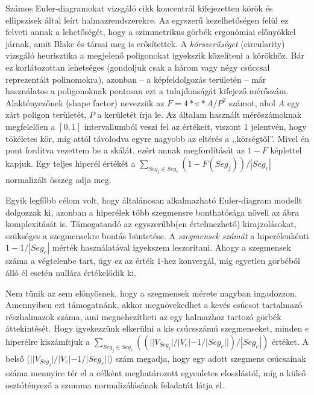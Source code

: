 Számos Euler-diagramokat vizsgáló cikk koncentrál kifejezetten körök és ellipszisek által leírt halmazrendszerekre. Az egyszerű kezelhetőségen felül ez felveti annak a lehetőségét, hogy a szimmetrikus görbék ergonómiai előnyökkel járnak, amit Blake és társai meg is erősítettek\cite{shape_comprehension}. A \textit{körszerűséget} (circularity) vizsgáló heurisztika a megjelenő poligonokat igyekszik közelíteni a körökhöz. Bár ez korlátozottan lehetséges (gondoljuk csak a három vagy négy csúccsal reprezentált polinomokra), azonban -- a képfeldolgozás területén -- már használatos a poligonoknak pontosan ezt a tulajdonságát kifejező mérőszám. Alaktényezőnek (shape factor) nevezzük az $F = 4 * \pi * A / P^2$ számot, ahol $A$ egy zárt poligon területét, $P$ a kerületét írja le. Az általam használt mérőszámoknak megfelelően a $[0,1]$ intervallumból veszi fel az értékeit, viszont $1$ jelentvén, hogy tökéletes kör, míg attól távolodva egyre nagyobb az eltérés a ,,körségtől''. Mivel én pont fordítva vezettem be a skálát, ezért annak megfordítását az $1-F$ képlettel kapjuk. Egy teljes hiperél értékét a $\sum_{Seg_j \in Seg_{e}} (1 - F(Seg_j)) / |Seg_{e}|$ normalizált összeg adja meg.


Egyik legfőbb célom volt, hogy általánosan alkalmazható Euler-diagram modellt dolgozzak ki, azonban a hiperélek több szegmensre bonthatósága növeli az ábra komplexitását is. Támogatandó az egyszerűbb(en értelmezhető) kirajzolásokat, szükséges a szegmensekre bontás büntetése. A \textit{szegmensek számát} a hiperélenkénti $1-1/|Seg_e|$ mérték használatával igyekszem leszorítani. Ahogy a szegmensek száma a végtelenbe tart, úgy ez az érték $1$-hez konvergál, míg egyetlen görbéből álló él esetén nullára értékelődik ki.


Nem tűnik az sem előnyösnek, hogy a szegmensek mérete nagyban ingadozzon. Amennyiben ezt támogatnánk, akkor megnövekedhet a kevés csúcsot tartalmazó részhalmazok száma, ami megnehezítheti az egy halmazhoz tartozó görbék áttekintését. Hogy igyekezzünk elkerülni a kis csúcsszámú szegmenseket, minden $e$ hiperélre kiszámítjuk a $\sum_{Seg_j \in Seg_e}((||V_{Seg_j}| / |V_e| - 1 / |Seg_e| |) / |Seg_e|)$ értéket. A belső ($||V_{Seg_j}| / |V_e| - 1 / |Seg_e| |$) szám megadja, hogy egy adott szegmens csúcsainak száma mennyire tér el a célként meghatározott egyenletes eloszlástól, míg a külső osztótényező a szumma normalizálásának feladatát látja el.


